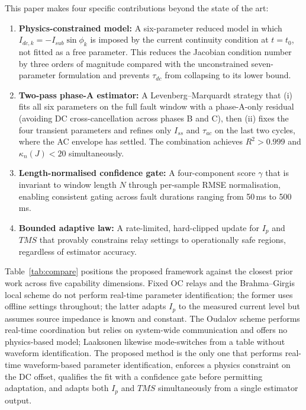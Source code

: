 \documentclass[journal, twoside, 10pt]{IEEEtran}
\begin{document}
This paper makes four specific contributions beyond the state of the art:
\begin{enumerate}
  \item \textbf{Physics-constrained model:} A six-parameter reduced model
        in which $I_{dc,k} = -I_{sub}\sin\phi_k$ is imposed by the current
        continuity condition at $t = t_0$, not fitted as a free parameter.
        This reduces the Jacobian condition number by three orders of magnitude
        compared with the unconstrained seven-parameter formulation and
        prevents $\tau_{dc}$ from collapsing to its lower bound.

  \item \textbf{Two-pass phase-A estimator:} A Levenberg--Marquardt strategy
        that (i) fits all six parameters on the full fault window with a
        phase-A-only residual (avoiding DC cross-cancellation across phases B
        and C), then (ii) fixes the four transient parameters and refines only
        $I_{ss}$ and $\tau_{ac}$ on the last two cycles, where the AC envelope
        has settled.  The combination achieves $R^2 > 0.999$ and
        $\kappa_n(J) < 20$ simultaneously.

  \item \textbf{Length-normalised confidence gate:} A four-component score
        $\gamma$ that is invariant to window length $N$ through per-sample
        RMSE normalisation, enabling consistent gating across fault durations
        ranging from 50\,ms to 500\,ms.

  \item \textbf{Bounded adaptive law:} A rate-limited, hard-clipped update
        for $I_p$ and $TMS$ that provably constrains relay settings to
        operationally safe regions, regardless of estimator accuracy.
\end{enumerate}

Table~\ref{tab:compare} positions the proposed framework against the closest
prior work across five capability dimensions.  Fixed OC relays
\cite{Blackburn2006} and the Brahma--Girgis local scheme \cite{Brahma2004}
do not perform real-time parameter identification; the former uses offline
settings throughout; the latter adapts $I_p$ to the measured current level but
assumes source impedance is known and constant.  The Oudalov scheme
\cite{Oudalov2009} performs real-time coordination but relies on
system-wide communication and offers no physics-based model; Laaksonen
\cite{Laaksonen2017} likewise mode-switches from a table without waveform
identification.  The proposed method is the only one that performs
real-time waveform-based parameter identification, enforces a
physics constraint on the DC offset, qualifies the fit with a
confidence gate before permitting adaptation, and adapts both $I_p$
and $TMS$ simultaneously from a single estimator output.
\end{document}
